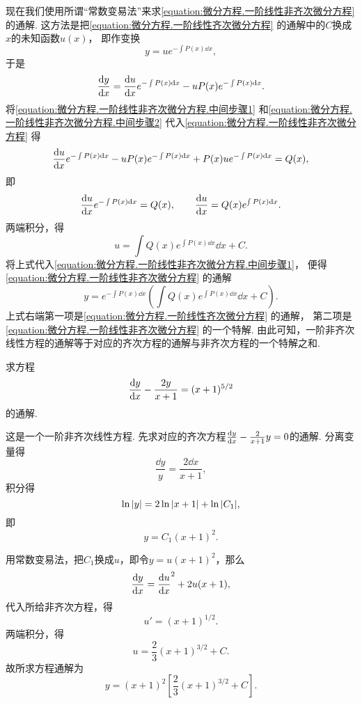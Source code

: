 现在我们使用所谓“常数变易法”来求\cref{equation:微分方程.一阶线性非齐次微分方程} 的通解.
这方法是把\cref{equation:微分方程.一阶线性齐次微分方程} 的通解中的\(C\)换成\(x\)的未知函数\(u(x)\)，
即作变换\begin{equation}\label{equation:微分方程.一阶线性非齐次微分方程.中间步骤1}
	y = u e^{ -\int P(x)\dd{x} },
\end{equation}
于是\begin{equation}\label{equation:微分方程.一阶线性非齐次微分方程.中间步骤2}
	\dv{y}{x} = \dv{u}{x} e^{ -\int P(x) \dd{x} } - u P(x) e^{ -\int P(x) \dd{x} }.
\end{equation}
将\cref{equation:微分方程.一阶线性非齐次微分方程.中间步骤1}
和\cref{equation:微分方程.一阶线性非齐次微分方程.中间步骤2}
代入\cref{equation:微分方程.一阶线性非齐次微分方程}
得\[
	\dv{u}{x} e^{ -\int P(x) \dd{x} }
	- u P(x) e^{ -\int P(x) \dd{x} }
	+ P(x) u e^{ -\int P(x) \dd{x} }
	= Q(x),
\]
即\[
	\dv{u}{x} e^{ -\int P(x) \dd{x} } = Q(x),
	\qquad
	\dv{u}{x} = Q(x) e^{ \int P(x) \dd{x} }.
\]
两端积分，得\[
	u = \int Q(x) e^{ \int P(x) \dd{x} } \dd{x} + C.
\]
将上式代入\cref{equation:微分方程.一阶线性非齐次微分方程.中间步骤1}，
便得\cref{equation:微分方程.一阶线性非齐次微分方程} 的通解\begin{equation}\label{equation:微分方程.一阶线性非齐次微分方程的通解}
	y = e^{ -\int P(x) \dd{x} } \left( \int Q(x) e^{ \int P(x) \dd{x} } \dd{x} + C \right).
\end{equation}
上式右端第一项是\cref{equation:微分方程.一阶线性齐次微分方程} 的通解，
第二项是\cref{equation:微分方程.一阶线性非齐次微分方程} 的一个特解.
由此可知，一阶非齐次线性方程的通解等于对应的齐次方程的通解与非齐次方程的一个特解之和.

\begin{example}
求方程\[
	\dv{y}{x} - \frac{2y}{x+1} = (x+1)^{5/2}
\]的通解.
\begin{solution}
这是一个一阶非齐次线性方程.
先求对应的齐次方程\(\dv{y}{x} - \frac{2}{x+1} y = 0\)的通解.
分离变量得\[
	\frac{\dd{y}}{y} = \frac{2 \dd{x}}{x+1},
\]
积分得\[
	\ln\abs{y} = 2\ln\abs{x+1}+ \ln\abs{C_1},
\]
即\[
	y = C_1 (x+1)^2.
\]

用常数变易法，把\(C_1\)换成\(u\)，即令\(y = u(x+1)^2\)，那么\[
	\dv{y}{x} = \dv{u}{x} (x+1)^2 + 2u(x+1),
\]
代入所给非齐次方程，得\[
	u' = (x+1)^{1/2}.
\]
两端积分，得\[
	u = \frac{2}{3} (x+1)^{3/2} + C.
\]
故所求方程通解为\[
	y = (x+1)^2 \left[
	\frac{2}{3} (x+1)^{3/2} + C
	\right].
\]
\end{solution}
\end{example}

